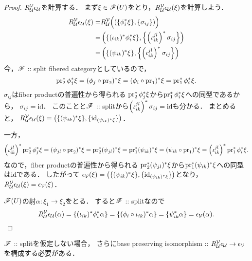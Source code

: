 \documentclass[a4paper, dvipdfmx]{jsarticle}
\begin{document}
\begin{proof}
    $R_{\covU}^{\covV}\epsilon_{\covU}$を計算する．
    まず$\xi \in \fibF(U)$をとり，$R_{\covU}^{\covV}\epsilon_{\covU}(\xi)$を計算しよう．
    \begin{align*}
        R_{\covU}^{\covV}\epsilon_{\covU}(\xi)
        =&  R_{\covU}^{\covV}\Big( (\{\phi_i^*\xi\}, \{\sigma_{ij}\}) \Big) \\
        =&  \left(\{(\iota_{ik})^*\phi_i^*\xi\}, \left\{\left(\iota_{ik}^{jl}\right)^*\sigma_{ij} \right\}\right) \\
        =&  \left(\{(\psi_{ik})^*\xi\}, \left\{\left(\iota_{ik}^{jl}\right)^*\sigma_{ij} \right\}\right)
    \end{align*}
    今，$\fibF$ :: split fibered categoryとしているので，
    \[ \pr_2^*\phi_j^* \xi=(\phi_j \circ \pr_2)^*\xi=(\phi_i \circ \pr_1)^*\xi=\pr_1^*\phi_i^* \xi. \]
    $\sigma_{ij}$はfiber productの普遍性から得られる
    $\pr_2^*\phi_j^* \xi$から$\pr_1^*\phi_i^* \xi$への同型であるから，
    $\sigma_{ij}=\id$．
    このことと$\fibF$ :: splitから$\left(\iota_{ik}^{jl}\right)^*\sigma_{ij}=\id$も分かる．
    まとめると，
    $R_{\covU}^{\covV}\epsilon_{\covU}(\xi)=\left(\{(\psi_{ik})^*\xi\}, \{\id[(\psi_{ik})^*\xi]\}\right)$．

    一方，
    \[
        \left(\iota_{ik}^{jl}\right)^*\pr_2^*\phi_j^* \xi
        =(\psi_{jl} \circ \pr_2)^*\xi
        =\pr_2^*(\psi_{jl})^*\xi
        =\pr_1^*(\psi_{ik})^*\xi
        =(\psi_{ik} \circ \pr_1)^*\xi
        =\left(\iota_{ik}^{jl}\right)^*\pr_1^*\phi_i^* \xi.
    \]
    なので，fiber productの普遍性から得られる
    $\pr_2^*(\psi_{jl})^*\xi$から$\pr_1^*(\psi_{ik})^*\xi$への同型は$\id$である．
    したがって
    $\epsilon_{\covV}(\xi)=\left(\{(\psi_{ik})^*\xi\}, \{\id[(\psi_{ik})^*\xi]\}\right)$となり，
    $R_{\covU}^{\covV}\epsilon_{\covU}(\xi)=\epsilon_{\covV}(\xi)$．
    
    $\fibF(U)$の射$\alpha \colon \xi_1 \to \xi_2$をとる．
    すると$\fibF$ :: splitなので
    \[
        R_{\covU}^{\covV}\epsilon_{\covU}(\alpha)
        =\{(\iota_{ik})^*\phi_i^*\alpha\}=\{(\phi_i \circ \iota_{ik})^*\alpha\}=\{\psi_{ik}^*\alpha\}
        =\epsilon_{\covV}(\alpha).
    \]
\end{proof}
\begin{Remark}
    $\fibF$ :: splitを仮定しない場合，
    さらにbase preserving isomorphism ::
    $R_{\covU}^{\covV}\epsilon_{\covU} \to \epsilon_{\covV}$を構成する必要がある．
\end{Remark}
\end{document}
